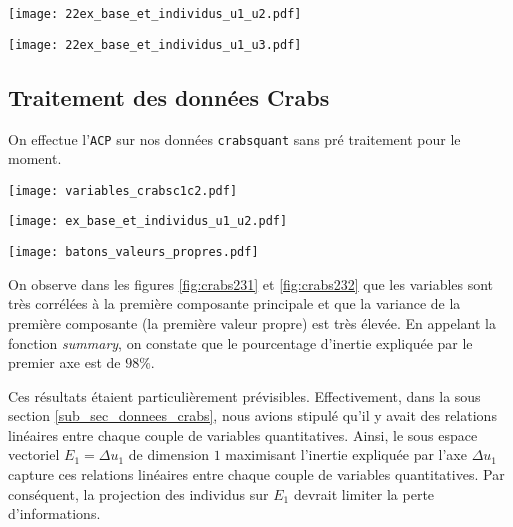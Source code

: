 \documentclass{article}
\begin{document}
\begin{multicols}{2}
\begingroup
    \centering
   \texttt{[image: 22ex\_base\_et\_individus\_u1\_u2.pdf]}
    \label{fig:ana225}
\endgroup

\begingroup
    \centering
   \texttt{[image: 22ex\_base\_et\_individus\_u1\_u3.pdf]}
    \label{fig:ana226}
\endgroup
\newpage
\subsection{Traitement des données Crabs}

On effectue l'\texttt{ACP} sur nos données \texttt{crabsquant} sans pré traitement pour le moment.


\begingroup
    \centering
   \texttt{[image: variables\_crabsc1c2.pdf]}
    \label{fig:crabs231}
\endgroup

\begingroup
    \centering
   \texttt{[image: ex\_base\_et\_individus\_u1\_u2.pdf]}
    \label{fig:crabs232}
\endgroup

\begingroup
    \centering
   \texttt{[image: batons\_valeurs\_propres.pdf]}
    \label{fig:crabs233}
\endgroup


On observe dans les figures \ref{fig:crabs231} et \ref{fig:crabs232} que les variables sont très corrélées à la première composante principale et que la variance de la première composante (la première valeur propre) est très élevée. En appelant la fonction \textit{summary}, on constate que le pourcentage d'inertie expliquée par le premier axe est de $98 \%$. 

Ces résultats étaient particulièrement prévisibles. Effectivement, dans la sous section \ref{sub_sec_donnees_crabs}, nous avions stipulé qu'il y avait des relations linéaires entre chaque couple de variables quantitatives. Ainsi, le sous espace vectoriel $E_1 = \Delta u_1$ de dimension $1$ maximisant l'inertie expliquée par l'axe $\Delta u_1$ capture ces relations linéaires entre chaque couple de variables quantitatives. Par conséquent, la projection des individus sur $E_1$ devrait limiter la perte d'informations. 


\end{multicols}
\end{document}
